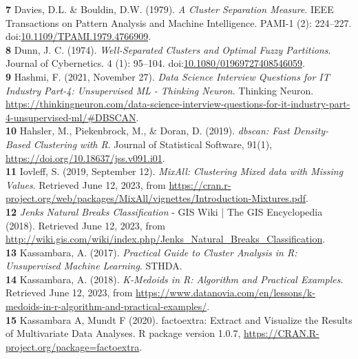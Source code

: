 \documentclass[11pt, a4paper]{article}
\begin{document}
\noindent\textbf{7} Davies, D.L. \& Bouldin, D.W. (1979). \textit{A Cluster Separation Measure}. IEEE Transactions on Pattern Analysis and Machine Intelligence. PAMI-1 (2): 224–227. doi:\sloppy\url{10.1109/TPAMI.1979.4766909}. \\

\noindent\textbf{8} Dunn, J. C. (1974). \textit{Well-Separated Clusters and Optimal Fuzzy Partitions}. Journal of Cybernetics. 4 (1): 95–104. doi:\sloppy\url{10.1080/01969727408546059}. \\

\noindent\textbf{9} Hashmi, F. (2021, November 27). \textit{Data Science Interview Questions for IT Industry Part-4: Unsupervised ML - Thinking 	Neuron}. Thinking Neuron. \sloppy\url{https://thinkingneuron.com/data-science-interview-questions-for-it-industry-part-4-unsupervised-ml/\#DBSCAN}. \\

\noindent\textbf{10} Hahsler, M., Piekenbrock, M., \& Doran, D. (2019). \textit{dbscan: Fast Density-Based Clustering with R}. Journal of Statistical Software, 91(1), \sloppy\url{https://doi.org/10.18637/jss.v091.i01}. \\

\noindent\textbf{11} Iovleff, S. (2019, September 12). \textit{MixAll: Clustering Mixed data with Missing Values}. Retrieved June 12, 2023, from \sloppy\url{https://cran.r-project.org/web/packages/MixAll/vignettes/Introduction-Mixtures.pdf}. \\

\noindent\textbf{12} \textit{Jenks Natural Breaks Classification} - GIS Wiki | The GIS Encyclopedia (2018). Retrieved June 12, 2023, from \sloppy\url{http://wiki.gis.com/wiki/index.php/Jenks_Natural_Breaks_Classification}. \\

\noindent\textbf{13} Kassambara, A. (2017). \textit{Practical Guide to Cluster Analysis in R: Unsupervised Machine Learning}. STHDA. \\

\noindent\textbf{14} Kassambara, A. (2018). \textit{K-Medoids in R: Algorithm and Practical Examples}. Retrieved June 12, 2023, from \sloppy\url{https://www.datanovia.com/en/lessons/k-medoids-in-r-algorithm-and-practical-examples/}. \\

\noindent\textbf{15} Kassambara A, Mundt F (2020). factoextra: Extract and Visualize the Results of Multivariate Data Analyses. R package version 1.0.7, \sloppy\url{https://CRAN.R-project.org/package=factoextra}. \\
\end{document}
